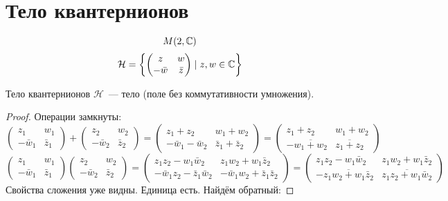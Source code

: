\section{Тело квантернионов}

$$M(2, \mathbb{C})$$
$$\mathcal{H} = \left\{\left(\begin{matrix}z & w \\ -\bar w & \bar z\end{matrix}\right) \mid z, w \in \mathbb{C}\right\}$$

\begin{theorem}{Тело квантернионов}
$\mathcal{H}$~--- тело (поле без коммутативности умножения).
\end{theorem}
\begin{proof}
Операции замкнуты:
$$\left(\begin{matrix}z_1 & w_1 \\ -\bar w_1 & \bar z_1\end{matrix}\right)+\left(\begin{matrix}z_2 & w_2 \\ -\bar w_2 & \bar z_2\end{matrix}\right) = \left(\begin{matrix}z_1+z_2 & w_1+w_2 \\ -\bar w_1-\bar w_2 & \bar z_1 + \bar z_2\end{matrix}\right) = \left(\begin{matrix}z_1+z_2 & w_1+w_2 \\ -\overline{w_1+w_2} & \overline{z_1+z_2}\end{matrix}\right)$$
$$\left(\begin{matrix}z_1 & w_1 \\ -\bar w_1 & \bar z_1\end{matrix}\right) \left(\begin{matrix}z_2 & w_2 \\ -\bar w_2 & \bar z_2\end{matrix}\right) = \left(\begin{matrix}z_1z_2 - w_1\bar w_2 & z_1 w_2+w_1 \bar z_2 \\ -\bar w_1z_2-\bar z_1\bar w_2 & -\bar w_1 w_2+\bar z_1\bar z_2\end{matrix}\right) = \left(\begin{matrix}z_1z_2 - w_1\bar w_2 & z_1 w_2+w_1 \bar z_2 \\ -\overline{z_1w_2+w_1\bar z_2} & \overline{z_1z_2+w_1\bar w_2}\end{matrix}\right)$$
Свойства сложения уже видны. Единица есть. Найдём обратный:

\end{proof}
